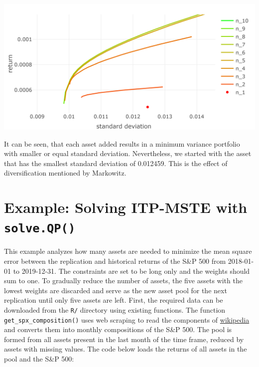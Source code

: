 \documentclass[
  oneside]{book}
\begin{document}
\includegraphics{Master_Thesis_files/figure-latex/qp_mvp4-1.png}

It can be seen, that each asset added results in a minimum variance portfolio with smaller or equal standard deviation. Nevertheless, we started with the asset that has the smallest standard deviation of 0.012459. This is the effect of diversification mentioned by Markowitz.

\hypertarget{exampleitpsolveqp}{%
\section{\texorpdfstring{Example: Solving ITP-MSTE with \texttt{solve.QP()}}{Example: Solving ITP-MSTE with solve.QP()}}\label{exampleitpsolveqp}}

This example analyzes how many assets are needed to minimize the mean square error between the replication and historical returns of the S\&P 500 from 2018-01-01 to 2019-12-31. The constraints are set to be long only and the weights should sum to one. To gradually reduce the number of assets, the five assets with the lowest weights are discarded and serve as the new asset pool for the next replication until only five assets are left. First, the required data can be downloaded from the \texttt{R/} directory using existing functions. The function \texttt{get\_spx\_composition()} uses web scraping to read the components of \href{https://en.wikipedia.org/wiki/List_of_S\%26P_500_companies}{wikipedia} and converts them into monthly compositions of the S\&P 500. The pool is formed from all assets present in the last month of the time frame, reduced by assets with missing values. The code below loads the returns of all assets in the pool and the S\&P 500:
\end{document}

